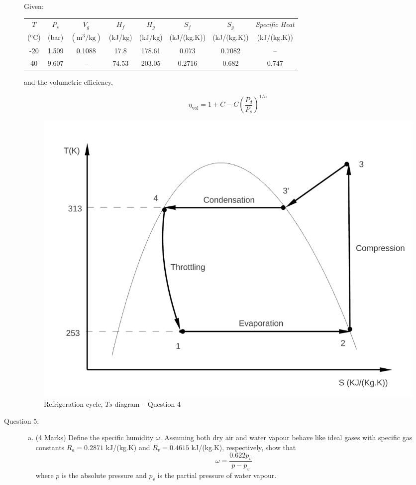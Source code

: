 \documentclass[12pt,twoside]{report}
\newcommand{\frc}{\displaystyle\frac}
\begin{document}
\begin{description}
\medskip
Given:
\begin{center}
\begin{tabular}{|c c| c c c c c c| }
\hline
$T$             & $P_{s}$  & $V_{g}$  & $H_{f}$  & $H_{g}$   &  $S_{f}$   &  $S_{g}$   & {\it Specific Heat} \\
($^{\text{o}}$C)  & (bar)   & $\left(\text{m}^{3}/\text{kg}\right)$ & (kJ/kg) & (kJ/kg) & (kJ/(kg.K)) &  (kJ/(kg.K)) &   (kJ/(kg.K)) \\
\hline
-20   & 1.509 & 0.1088 & 17.8 & 178.61 & 0.073 & 0.7082 & -- \\
40    & 9.607 & --     & 74.53 & 203.05 & 0.2716 & 0.682 & 0.747 \\
\hline
\end{tabular}
\end{center}

and the volumetric efficiency,

\begin{displaymath}
\eta_{\text{vol}} = 1 + C - C\left(\frc{P_{d}}{P_{s}}\right)^{1/n} 
\end{displaymath}

\begin{figure}[h]
\begin{center}
\includegraphics[width=10.cm,clip]{./Pics/Exam_Refrigeration1}
\caption{ Refrigeration cycle, $Ts$ diagram  -- Question 4}
\label{exam_refrig1}
\end{center}
\end{figure}

\clearpage

\item [Question 5:]\mbox{}
\begin{enumerate}[(a)]
\item (4 Marks) Define the specific humidity $\omega$. Assuming both dry air and water vapour behave like ideal gases with specific gas constants $R_{a}=0.2871$ kJ/(kg.K) and $R_{v}=0.4615$ kJ/(kg.K), respectively, show that
\begin{displaymath}
\omega = \frc{0.622 p_{v}}{p-p_{v}}
\end{displaymath}
where $p$ is the absolute pressure and $p_{v}$ is the partial pressure of water vapour. 
\medskip


\end{enumerate}
\end{description}
\end{document}
